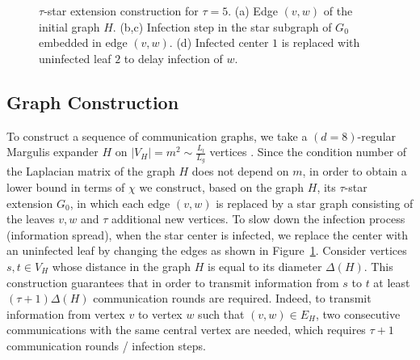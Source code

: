 \documentclass[a4paper,USenglish,cleveref, autoref, thm-restate]{lipics-v2021}
\begin{document}
\begin{figure}[h]
{
    }
    \caption{$\tau$-star extension construction for $\tau=5$. (a) Edge $(v, w)$ of the initial graph $H$. (b,c) Infection step in the star subgraph of $G_0$ embedded in edge $(v, w)$. (d) Infected center $1$ is replaced with uninfected leaf $2$ to delay infection of $w$.}
\label{fig:stars}
\end{figure}

\subsection{Graph Construction}
To construct a sequence of communication graphs, we take a $(d = 8)$-regular Margulis expander $H$ on $|V_H| = m^2 \sim \frac{L_l}{L_g}$ vertices \cite[Theorem 8.2]{hoory2006expander}.
Since the condition number of the Laplacian matrix of the graph $H$ does not depend on $m$, in order to obtain a lower bound in terms of $\chi$ we construct, based on the graph $H$, its $\tau$-star extension $G_0$, in which each edge $(v, w)$ is replaced by a star graph consisting of the leaves $v, w$ and $\tau$ additional new vertices.
To slow down the infection process (information spread), when the star center is infected, we replace the center with an uninfected leaf by changing the edges as shown in Figure~\ref{fig:stars}.
Consider vertices $s, t \in V_H$ whose distance in the graph $H$ is equal to its diameter $\Delta(H)$.
This construction guarantees that in order to transmit information from $s$ to $t$ at least $(\tau+1)\Delta(H)$ communication rounds are required. Indeed, to transmit information from vertex $v$ to vertex $w$ such that $(v, w) \in E_H$, two consecutive communications with the same central vertex are needed, which requires $\tau+1$ communication rounds / infection steps.
\end{document}
